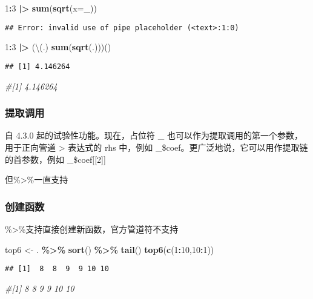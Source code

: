 \documentclass[
]{article}
\newenvironment{Shaded}{\begin{snugshade}}{\end{snugshade}}
\newcommand{\AttributeTok}[1]{\textcolor[rgb]{0.13,0.29,0.53}{#1}}
\newcommand{\CommentTok}[1]{\textcolor[rgb]{0.56,0.35,0.01}{\textit{#1}}}
\newcommand{\DecValTok}[1]{\textcolor[rgb]{0.00,0.00,0.81}{#1}}
\newcommand{\FunctionTok}[1]{\textcolor[rgb]{0.13,0.29,0.53}{\textbf{#1}}}
\newcommand{\NormalTok}[1]{#1}
\newcommand{\OtherTok}[1]{\textcolor[rgb]{0.56,0.35,0.01}{#1}}
\newcommand{\SpecialCharTok}[1]{\textcolor[rgb]{0.81,0.36,0.00}{\textbf{#1}}}
\begin{document}
\begin{Shaded}
\begin{Highlighting}[]
\DecValTok{1}\SpecialCharTok{:}\DecValTok{3} \SpecialCharTok{|\textgreater{}} \FunctionTok{sum}\NormalTok{(}\FunctionTok{sqrt}\NormalTok{(}\AttributeTok{x=}\NormalTok{\_))}
\end{Highlighting}
\end{Shaded}

\begin{verbatim}
## Error: invalid use of pipe placeholder (<text>:1:0)
\end{verbatim}

\begin{Shaded}
\begin{Highlighting}[]
\DecValTok{1}\SpecialCharTok{:}\DecValTok{3} \SpecialCharTok{|\textgreater{}}\NormalTok{ (\textbackslash{}(.) }\FunctionTok{sum}\NormalTok{(}\FunctionTok{sqrt}\NormalTok{(.)))()}
\end{Highlighting}
\end{Shaded}

\begin{verbatim}
## [1] 4.146264
\end{verbatim}

\begin{Shaded}
\begin{Highlighting}[]
\CommentTok{\#[1] 4.146264}
\end{Highlighting}
\end{Shaded}

\subsubsection{提取调用}\label{ux63d0ux53d6ux8c03ux7528}

自 4.3.0 起的试验性功能。现在，占位符 \_ 也可以作为提取调用的第一个参数，用于正向管道 \textbar\textgreater{} 表达式的 rhs 中，例如 \_\$coef。更广泛地说，它可以用作提取链的首参数，例如 \_\$coef{[}{[}2{]}{]}

但\%\textgreater\%一直支持

\subsubsection{创建函数}\label{ux521bux5efaux51fdux6570}

\%\textgreater\%支持直接创建新函数，官方管道符不支持

\begin{Shaded}
\begin{Highlighting}[]
\NormalTok{top6 }\OtherTok{\textless{}{-}}\NormalTok{ . }\SpecialCharTok{\%\textgreater{}\%} \FunctionTok{sort}\NormalTok{() }\SpecialCharTok{\%\textgreater{}\%} \FunctionTok{tail}\NormalTok{()}
\FunctionTok{top6}\NormalTok{(}\FunctionTok{c}\NormalTok{(}\DecValTok{1}\SpecialCharTok{:}\DecValTok{10}\NormalTok{,}\DecValTok{10}\SpecialCharTok{:}\DecValTok{1}\NormalTok{))}
\end{Highlighting}
\end{Shaded}

\begin{verbatim}
## [1]  8  8  9  9 10 10
\end{verbatim}

\begin{Shaded}
\begin{Highlighting}[]
\CommentTok{\#[1]  8  8  9  9 10 10}
\end{Highlighting}
\end{Shaded}


\printbibliography
\end{document}
